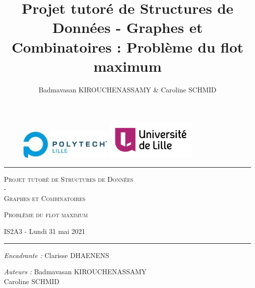 \documentclass[11pt, a4paper]{report}
\author{Badmavasan KIROUCHENASSAMY \& Caroline SCHMID}
\date{}
\title{Projet tutoré de Structures de Données - Graphes et Combinatoires : Problème du flot maximum}
\begin{document}
	\begin{titlepage}
		\begin{center}
			
			\vspace*{1cm}
			
			\begin{figure}[h]
				\centering
				\includegraphics[width=0.4\textwidth]{images/LOGO_Polytech-lille.jpg}
				\hspace{2cm}
				\includegraphics[width=0.4\textwidth]{images/logo_ulille_transparent.png}
			\end{figure}
			
			\vspace*{2cm}
			
			\rule{1\textwidth}{.8pt}
			
			\LARGE{\textsc{Projet tutoré de Structures de Données \\-\\ Graphes et Combinatoires}}
			
			\vspace*{1cm}
			
			\LARGE{\textsc{Problème du flot maximum}}
			\vspace*{1cm}
			
			\small{IS2A3 - Lundi 31 mai 2021}
			
			\vspace*{0.5cm}
			\rule{1\textwidth}{.10pt}
		
			\vspace*{2.352cm}
			
			\large{\textit{Encadrante :} Clarisse DHAENENS}
			
			\vspace*{0.1cm}	        
			
			\large{\textit{Auteurs :} {Badmavasan KIROUCHENASSAMY\\Caroline SCHMID}}
			
			
			
			
		\end{center}
		
	\end{titlepage}
	
\end{document}
